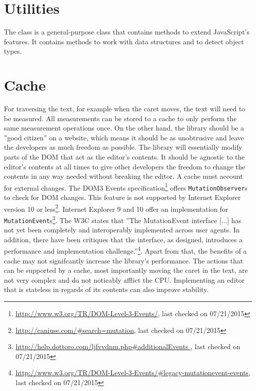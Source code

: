 


\section{Utilities}
\label{sec:utilities_class}
The  class is a general-purpose class that contains methods to extend JavaScript's features. It contains methods to work with data structures and to detect object types.

\section{Cache}
\label{sec:cache}

For traversing the text, for example when the caret moves, the text will need to be measured. All measurements can be stored to a cache to only perform the same measurement operations once. On the other hand, the library should be a ''good citizen'' on a website, which means it should be as unobtrusive and leave the developers as much freedom as possible. The library will essentially modify parts of the DOM that act as the editor's contents. It should be agnostic to the editor's contents at all times to give other developers the freedom to change the contents in any way needed without breaking the editor. A cache must account for external changes. The DOM3 Events specification\footnote{\url{http://www.w3.org/TR/DOM-Level-3-Events/}, last checked on 07/21/2015} offers \texttt{MutationObserver}s to check for DOM changes. This feature is not supported by Internet Explorer version 10 or less\footnote{\url{http://caniuse.com/\#search=mutation}, last checked on 07/21/2015}. Internet Explorer 9 and 10 offer an implementation for \texttt{MutationEvent}s\footnote{\url{http://help.dottoro.com/ljfvvdnm.php\#additionalEvents }, last checked on 07/21/2015}. The W3C states that ''The MutationEvent interface [...] has not yet been completely and interoperably implemented across user agents. In addition, there have been critiques that the interface, as designed, introduces a performance and implementation challenge.''\footnote{\url{http://www.w3.org/TR/DOM-Level-3-Events/\#legacy-mutationevent-events}, last checked on 07/21/2015}. Apart from that, the benefits of a cache may not signifcantly increase the library's performance. The actions that can be supported by a cache, most importantly moving the caret in the text, are not very complex and do not noticably afflict the CPU. Implementing an editor that is stateless in regards of its contents can also improve stability.


